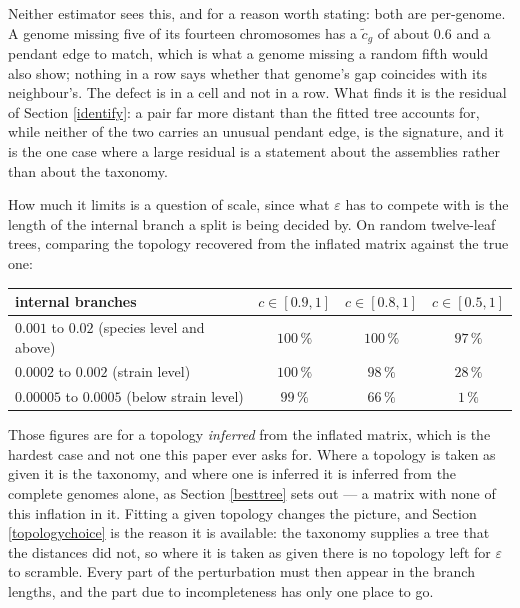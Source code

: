 \documentclass[pdflatex,sn-vancouver-num]{sn-jnl}
\begin{document}
Neither estimator sees this, and for a reason worth stating: both are per-genome. A genome missing
five of its fourteen chromosomes has a $\tilde{c}_g$ of about $0.6$ and a pendant edge to match,
which is what a genome missing a random fifth would also show; nothing in a row says whether that
genome's gap coincides with its neighbour's. The defect is in a cell and not in a row. What finds it
is the residual of Section \ref{identify}: a pair far more distant than the fitted tree accounts for,
while neither of the two carries an unusual pendant edge, is the signature, and it is the one case
where a large residual is a statement about the assemblies rather than about the taxonomy.

How much it limits is a question of scale, since what $\varepsilon$ has to compete with is the length
of the internal branch a split is being decided by. On random twelve-leaf trees, comparing the
topology recovered from the inflated matrix against the true one:

\begin{center}\footnotesize
\begin{tabular}{@{}l|c|c|c@{}}
 \textbf{internal branches} & \textbf{$c \in [0.9,1]$} & \textbf{$c \in [0.8,1]$} & \textbf{$c \in [0.5,1]$}\\
 \hline
 $0.001$ to $0.02$ \quad (species level and above) & $100\,\%$ & $100\,\%$ & $97\,\%$\\
 $0.0002$ to $0.002$ \quad (strain level)          & $100\,\%$ & $98\,\%$  & $28\,\%$\\
 $0.00005$ to $0.0005$ \quad (below strain level)  & $99\,\%$  & $66\,\%$  & $1\,\%$\\
\end{tabular}
\end{center}

\noindent
Those figures are for a topology \emph{inferred} from the inflated matrix, which is the hardest case
and not one this paper ever asks for. Where a topology is taken as given it is the taxonomy, and where
one is inferred it is inferred from the complete genomes alone, as Section \ref{besttree} sets out ---
a matrix with none of this inflation in it. Fitting a given topology changes the picture, and
Section \ref{topologychoice} is the reason it is available: the taxonomy supplies a tree that the
distances did not, so where it is taken as given there is no topology left for $\varepsilon$ to
scramble. Every part of the perturbation must then appear in the branch lengths, and the part due to
incompleteness has only one place to go.
\end{document}
